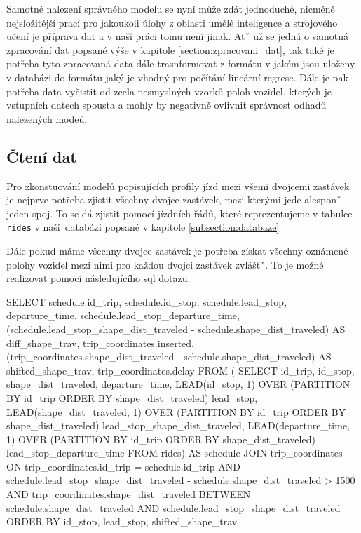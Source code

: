 Samotné nalezení správného modelu se nyní může zdát jednoduché, nicméně nejsložitější prací pro jakoukoli úlohy z oblasti umělé inteligence a strojového učení je příprava dat a v naší práci tomu není jinak. Atˇ už se jedná o samotná zpracování dat popsané výše v kapitole \ref{section:zpracovani_dat}, tak také je potřeba tyto zpracovaná data dále trasnformovat z formátu v jakém jsou uloženy v databázi do formátu jaký je vhodný pro počítání lineární regrese. Dále je pak potřeba data vyčistit od zcela nesmyslných vzorků poloh vozidel, kterých je vstupních datech spousta a mohly by negativně ovlivnit správnost odhadů nalezených modeů.

\subsection{Čtení dat}

Pro zkonstuování modelů popisujících profily jízd mezi všemi dvojcemi zastávek je nejprve potřeba zjistit všechny dvojce zastávek, mezi kterými jede alesponˇ jeden spoj. To se dá zjistit pomocí jízdních řádů, které reprezentujeme v tabulce \verb-rides- v naší databázi popsané v kapitole \ref{subsection:databaze}

\bigbreak

 Dále pokud máme všechny dvojce zastávek je potřeba získat všechny oznámené polohy vozidel mezi nimi pro každou dvojci zastávek zvláštˇ. To je možné realizovat pomocí následujícího \gls{sql} dotazu.

\begin{code}[frame=none]
SELECT schedule.id_trip,
  schedule.id_stop,
  schedule.lead_stop,
  departure_time,
  schedule.lead_stop_departure_time,
  (schedule.lead_stop_shape_dist_traveled - schedule.shape_dist_traveled)
    AS diff_shape_trav,
  trip_coordinates.inserted,
  (trip_coordinates.shape_dist_traveled - schedule.shape_dist_traveled)
    AS shifted_shape_trav,
  trip_coordinates.delay
FROM (
  SELECT id_trip, id_stop, shape_dist_traveled, departure_time,
    LEAD(id_stop, 1) OVER (PARTITION BY
	  id_trip ORDER BY shape_dist_traveled) lead_stop,
    LEAD(shape_dist_traveled, 1) OVER (PARTITION BY
	  id_trip ORDER BY shape_dist_traveled) lead_stop_shape_dist_traveled,
    LEAD(departure_time, 1) OVER (PARTITION BY
	  id_trip ORDER BY shape_dist_traveled) lead_stop_departure_time
  FROM rides) AS schedule
JOIN trip_coordinates
ON trip_coordinates.id_trip = schedule.id_trip AND
  schedule.lead_stop_shape_dist_traveled -
    schedule.shape_dist_traveled > 1500 AND
  trip_coordinates.shape_dist_traveled
    BETWEEN schedule.shape_dist_traveled AND
  schedule.lead_stop_shape_dist_traveled
ORDER BY id_stop, lead_stop, shifted_shape_trav
\end{code}

